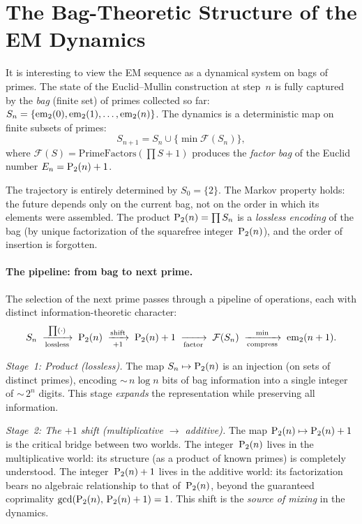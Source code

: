 \section{The Bag-Theoretic Structure of the EM Dynamics}
\label{sec:bag}
It is interesting to view the EM sequence as a dynamical system on bags of primes.
The state of the Euclid--Mullin construction at step~$n$ is fully captured
by the \emph{bag} (finite set) of primes collected so far:
$S_n = \{\mathrm{em}_{2}(0), \mathrm{em}_{2}(1), \ldots, \mathrm{em}_{2}(n)\}$.
The dynamics is a deterministic map on finite subsets of primes:
\[
S_{n+1} = S_n \cup \{\min \mathcal{F}(S_n)\},
\]
where $\mathcal{F}(S) = \text{PrimeFactors}(\prod S + 1)$ produces the
\emph{factor bag} of the Euclid number $E_n = \mathrm{P}_{2}(n) + 1$.

The trajectory is entirely determined by $S_0 = \{2\}$.  The Markov
property holds: the future depends only on the current bag, not on the
order in which its elements were assembled.  The product
$\mathrm{P}_{2}(n) = \prod S_n$ is a \emph{lossless encoding} of the bag (by
unique factorization of the squarefree integer~$\mathrm{P}_{2}(n)$), and the
order of insertion is forgotten.

\paragraph{The pipeline: from bag to next prime.}
The selection of the next prime passes through a pipeline of operations,
each with distinct information-theoretic character:
\[
S_n \;\xrightarrow[\text{lossless}]{\prod(\cdot)}\;
\mathrm{P}_{2}(n) \;\xrightarrow[+1]{\text{shift}}\;
\mathrm{P}_{2}(n)+1 \;\xrightarrow[\text{factor}]{}\;
\mathcal{F}(S_n) \;\xrightarrow[\text{compress}]{\min}\;
\mathrm{em}_{2}(n+1).
\]

\emph{Stage~1: Product (lossless).}  The map $S_n \mapsto \mathrm{P}_{2}(n)$ is
an injection (on sets of distinct primes), encoding ${\sim}\, n \log n$
bits of bag information into a single integer of ${\sim}\, 2^n$ digits.
This stage \emph{expands} the representation while preserving all
information.

\emph{Stage~2: The $+1$ shift (multiplicative $\to$ additive).}  The map
$\mathrm{P}_{2}(n) \mapsto \mathrm{P}_{2}(n)+1$ is the critical bridge between two worlds.
The integer~$\mathrm{P}_{2}(n)$ lives in the multiplicative world: its structure
(as a product of known primes) is completely understood.  The
integer~$\mathrm{P}_{2}(n)+1$ lives in the additive world: its factorization
bears no algebraic relationship to that of~$\mathrm{P}_{2}(n)$, beyond the
guaranteed coprimality $\gcd(\mathrm{P}_{2}(n),\, \mathrm{P}_{2}(n)+1) = 1$.  This shift
is the \emph{source of mixing} in the dynamics.

